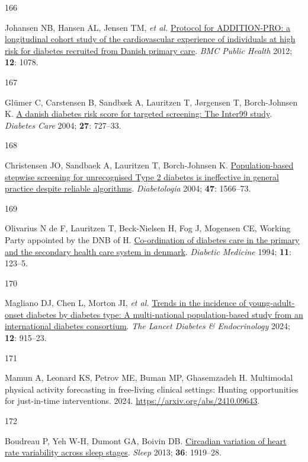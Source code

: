 \documentclass[
  a4paper,
  headsepline=true,
  open=left]{scrbook}
\newlength{\cslhangindent}
\newlength{\csllabelwidth}
\newlength{\cslentryspacingunit} %
\newenvironment{CSLReferences}[2] %
 {%
  \setlength{\parindent}{0pt}
  \ifodd #1
  \let\oldpar\par
  \def\par{\hangindent=\cslhangindent\oldpar}
  \fi
  \setlength{\parskip}{#2\cslentryspacingunit}
 }%
 {}
\newcommand{\CSLLeftMargin}[1]{\parbox[t]{\csllabelwidth}{#1}}
\newcommand{\CSLRightInline}[1]{\parbox[t]{\linewidth - \csllabelwidth}{#1}\break}
\begin{document}
\begin{CSLReferences}{0}{0}
\leavevmode{}%
\CSLLeftMargin{166 }%
\CSLRightInline{Johansen NB, Hansen AL, Jensen TM, \emph{et al.}
\href{https://doi.org/10.1186/1471-2458-12-1078}{Protocol for
ADDITION-PRO: a longitudinal cohort study of the cardiovascular
experience of individuals at high risk for diabetes recruited from
Danish primary care}. \emph{BMC Public Health} 2012; \textbf{12}: 1078.}

\leavevmode{}%
\CSLLeftMargin{167 }%
\CSLRightInline{Glümer C, Carstensen B, Sandbæk A, Lauritzen T,
Jørgensen T, Borch-Johnsen K.
\href{https://doi.org/10.2337/diacare.27.3.727}{A danish diabetes risk
score for targeted screening: The Inter99 study}. \emph{Diabetes Care}
2004; \textbf{27}: 727--33.}

\leavevmode{}%
\CSLLeftMargin{168 }%
\CSLRightInline{Christensen JO, Sandbaek A, Lauritzen T, Borch-Johnsen
K. \href{https://doi.org/10.1007/s00125-004-1496-2}{Population-based
stepwise screening for unrecognised Type 2 diabetes is ineffective in
general practice despite reliable algorithms}. \emph{Diabetologia} 2004;
\textbf{47}: 1566--73.}

\leavevmode{}%
\CSLLeftMargin{169 }%
\CSLRightInline{Olivarius N de F, Lauritzen T, Beck-Nielsen H, Fog J,
Mogensen CE, Working Party appointed by the DNB of H.
\href{https://doi.org/10.1111/j.1464-5491.1994.tb00243.x}{Co-ordination
of diabetes care in the primary and the secondary health care system in
denmark}. \emph{Diabetic Medicine} 1994; \textbf{11}: 123--5.}

\leavevmode{}%
\CSLLeftMargin{170 }%
\CSLRightInline{Magliano DJ, Chen L, Morton JI, \emph{et al.}
\href{https://doi.org/10.1016/S2213-8587(24)00243-2}{Trends in the
incidence of young-adult-onset diabetes by diabetes type: A
multi-national population-based study from an international diabetes
consortium}. \emph{The Lancet Diabetes \& Endocrinology} 2024;
\textbf{12}: 915--23.}

\leavevmode{}%
\CSLLeftMargin{171 }%
\CSLRightInline{Mamun A, Leonard KS, Petrov ME, Buman MP, Ghasemzadeh H.
Multimodal physical activity forecasting in free-living clinical
settings: Hunting opportunities for just-in-time interventions. 2024.
\url{https://arxiv.org/abs/2410.09643}.}

\leavevmode{}%
\CSLLeftMargin{172 }%
\CSLRightInline{Boudreau P, Yeh W-H, Dumont GA, Boivin DB.
\href{https://doi.org/10.5665/sleep.3230}{Circadian variation of heart
rate variability across sleep stages}. \emph{Sleep} 2013; \textbf{36}:
1919--28.}


\end{CSLReferences}
\end{document}
